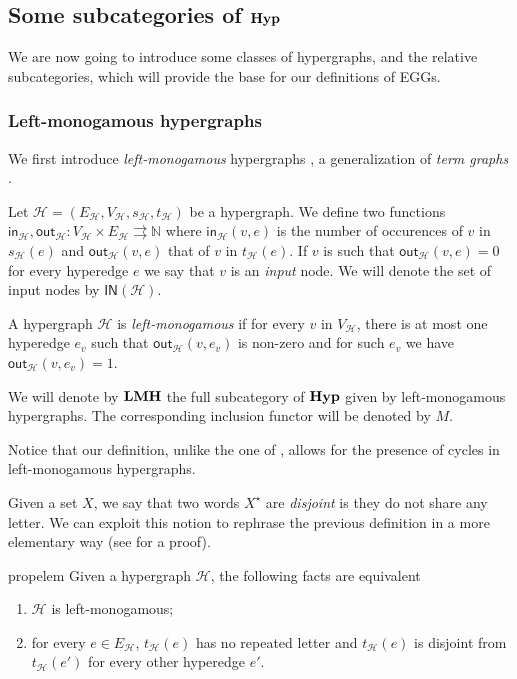 \documentclass[3p]{elsarticle}
\newcommand{\ind}[1]{\mathsf{in}_{\mathcal{#1}}}
\newcommand{\ino}[1]{\mathsf{IN}({\mathcal{#1}})}
\newcommand{\outd}[1]{\mathsf{out}_{\mathcal{#1}}}
\newcommand{\catname}[1]{\textbf{\textup{#1}}}
\newcommand{\lmo}{\catname{LMH}}
\newcommand{\hyp}{\catname{Hyp}}
\theoremstyle{remark}
\theoremstyle{definition}
\begin{document}
\subsection{Some subcategories of $\hyp$}\label{sub:sub}

We are now going to introduce some classes of hypergraphs, and the relative subcategories, which will provide the base for our definitions of EGGs.


\subsubsection{Left-monogamous hypergraphs}\label{par:lm}
We first introduce \emph{left-monogamous} hypergraphs \cite{milosavljevic2023string,fritz2023free}, a generalization of \emph{term graphs} \cite{CorradiniG05,Plu:TGR-ENTCS}.  

\begin{defi}
	Let $\mathcal{H}=(E_{\mathcal{H}}, V_{\mathcal{H}}, s_{\mathcal{H}}, t_{\mathcal{H}})$ be a hypergraph. We define two functions $\ind{H}, \outd{H}\colon V_{\mathcal{H}}\times E_{\mathcal{H}}\rightrightarrows \mathbb{N}$ where $\ind{H}(v,e)$ is the number of occurences of $v$ in $s_{\mathcal{H}}(e)$ and $\outd{H}(v,e)$ that of $v$ in $t_{\mathcal{H}}(e)$. If $v$ is such that $\outd{H}(v,e)=0$ for every hyperedge $e$ we say that $v$ is an \emph{input} node. We will denote the set of input nodes by $\ino{H}$.
	
	A hypergraph $\mathcal{H}$ is \emph{left-monogamous} if for every $v$ in $V_\mathcal{H}$, there is at most one hyperedge $e_v$ such that $\outd{H}(v,e_v)$ is non-zero and for such $e_v$ we have $\outd{H}(v,e_v) = 1$.
	
	We will denote by $\lmo$ the full subcategory of $\hyp$ given by left-monogamous hypergraphs. The corresponding inclusion functor will be denoted by $M$.
\end{defi}


\begin{rem}Notice that our definition, unlike the one of \cite{fritz2023free}, allows for the presence of cycles in left-monogamous hypergraphs.
\end{rem}

Given a set $X$, we say that two words $X^\star$ are \emph{disjoint} is they do not share any letter. We can exploit this notion to rephrase the previous definition in a more elementary way (see  for a proof).
\begin{restatable}{prop}{elem}\label{rem:elem} Given a hypergraph $\mathcal{H}$, the following facts are equivalent
	\begin{enumerate}
		\item $\mathcal{H}$ is left-monogamous;
		\item for every $e\in E_{\mathcal{H}}$, $t_{\mathcal{H}}(e)$ has no repeated letter and $t_{\mathcal{H}}(e)$ is disjoint from $t_{\mathcal{H}}(e')$ for every other hyperedge $e'$.
	\end{enumerate}
\end{restatable} 
\end{document}
